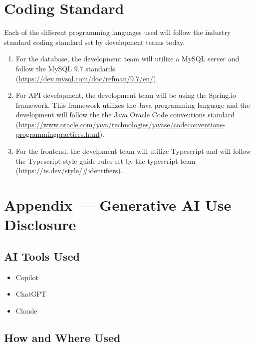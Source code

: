 \documentclass{article}
\begin{document}
\section{Coding Standard}

Each of the different programming languages used will follow the industry standard coding standard set by development teams today. 
\begin{enumerate}
    \item For the database, the development team will utilize a MySQL server and follow the MySQL 9.7 standards (\url{https://dev.mysql.com/doc/refman/9.7/en/}).
    \item For API development, the development team will be using the Spring.io framework. This framework utilizes the Java programming language and the development will follow the the Java Oracle Code conventions standard (\url{https://www.oracle.com/java/technologies/javase/codeconventions-programmingpractices.html}).
    \item For the frontend, the develpment team will utilize Typescript and will follow the Typescript style guide rules set by the typescript team (\url{https://ts.dev/style/#identifiers}).
\end{enumerate}

\newpage{}

\section{Appendix --- Generative AI Use Disclosure}



\subsection{AI Tools Used}

\begin{itemize}
  \item Copilot
  \item ChatGPT
  \item Claude  
\end{itemize}

\subsection{How and Where Used}
\end{document}
